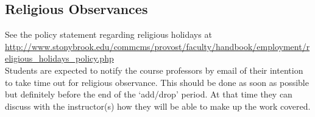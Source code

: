\documentclass[11pt]{article}
\begin{document}
\subsection*{Religious Observances}

See the policy statement regarding religious holidays at\hfill\\
{\footnotesize \url{http://www.stonybrook.edu/commcms/provost/faculty/handbook/employment/religious_holidays_policy.php}} \\
%
Students are expected to notify the course professors by email of
their intention to take time out for religious observance.  This
should be done as soon as possible but definitely before the end of
the `add/drop' period.  At that time they can discuss with the
instructor(s) how they will be able to make up the work covered.
\end{document}
